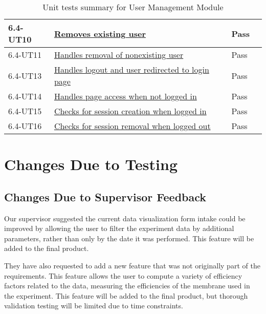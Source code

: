 \documentclass[12pt, titlepage]{article}
\begin{document}
\begin{table}[H]
\begin{tabular}{|l|l|l|l|}
    \hline
    6.4-UT10 & \href{https://github.com/SumanyaG/Alkalytics/blob/main/src/backend/test/userServiceTest.py}{Removes existing user} & Pass\\
    \hline
    6.4-UT11 & \href{https://github.com/SumanyaG/Alkalytics/blob/main/src/backend/test/userServiceTest.py}{Handles removal of nonexisting user} & Pass\\
    \hline
    6.4-UT13 & \href{https://github.com/SumanyaG/Alkalytics/blob/main/src/frontend/test/components/auth/AccountMenu.test.tsx}{Handles logout and user redirected to login page} & Pass\\
    \hline
    6.4-UT14 & \href{https://github.com/SumanyaG/Alkalytics/blob/main/src/frontend/test/components/auth/ProtectedRoute.test.tsx}{Handles page access when not logged in} & Pass\\
    \hline
    6.4-UT15 & \href{https://github.com/SumanyaG/Alkalytics/blob/main/src/frontend/test/context/authContext.test.tsx}{Checks for session creation when logged in} & Pass\\
    \hline
    6.4-UT16 & \href{https://github.com/SumanyaG/Alkalytics/blob/main/src/frontend/test/context/authContext.test.tsx}{Checks for session removal when logged out} & Pass\\
    \hline
  \end{tabular}
  \caption{Unit tests summary for User Management Module}
  \label{UT:UM}
\end{table}

\section{Changes Due to Testing}
\subsection{Changes Due to Supervisor Feedback}

Our supervisor suggested the current data visualization form intake could be
improved by allowing the user to filter the experiment data by additional
parameters, rather than only by the date it was performed. This feature will be
added to the final product.

They have also requested to add a new feature that was not originally part of
the requirements. This feature allows the user to compute a variety of
efficiency factors related to the data, measuring the efficiencies of the
membrane used in the experiment. This feature will be added to the final
product, but thorough validation testing will be limited due to time
constraints.
\end{document}
